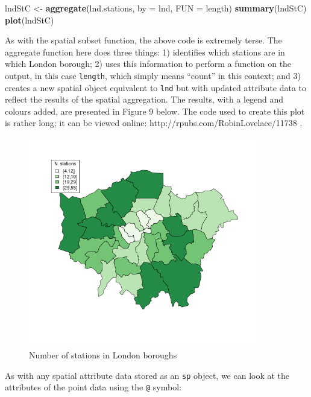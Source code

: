 \documentclass[]{article}
\newenvironment{Shaded}{}{}
\newcommand{\KeywordTok}[1]{\textcolor[rgb]{0.00,0.44,0.13}{\textbf{{#1}}}}
\newcommand{\DataTypeTok}[1]{\textcolor[rgb]{0.56,0.13,0.00}{{#1}}}
\newcommand{\NormalTok}[1]{{#1}}
\let\Oldincludegraphics\includegraphics
\renewcommand{\includegraphics}[1]{\Oldincludegraphics[width=10cm]{#1}}
\begin{document}
\begin{Shaded}
\begin{Highlighting}[]
\NormalTok{lndStC <- }\KeywordTok{aggregate}\NormalTok{(lnd.stations, }\DataTypeTok{by =} \NormalTok{lnd, }\DataTypeTok{FUN =} \NormalTok{length)}
\KeywordTok{summary}\NormalTok{(lndStC)}
\KeywordTok{plot}\NormalTok{(lndStC)}
\end{Highlighting}
\end{Shaded}
As with the spatial subset function, the above code is extremely terse.
The aggregate function here does three things: 1) identifies which
stations are in which London borough; 2) uses this information to
perform a function on the output, in this case \texttt{length}, which
simply means ``count'' in this context; and 3) creates a new spatial
object equivalent to \texttt{lnd} but with updated attribute data to
reflect the results of the spatial aggregation. The results, with a
legend and colours added, are presented in Figure 9 below. The code used
to create this plot is rather long; it can be viewed online:
http://rpubs.com/RobinLovelace/11738 .

\begin{figure}[htbp]
\centering
\includegraphics{figure/nStations.png}
\caption{Number of stations in London boroughs}
\end{figure}

As with any spatial attribute data stored as an \texttt{sp} object, we
can look at the attributes of the point data using the \texttt{@}
symbol:
\end{document}
